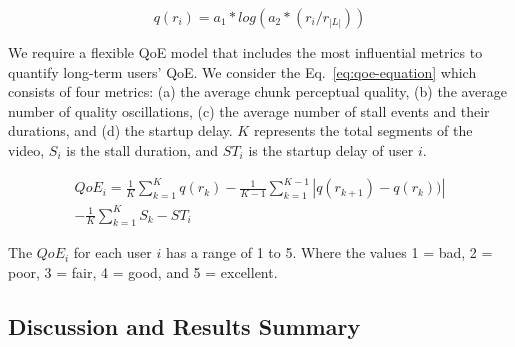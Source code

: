 $$
q(r_i) = a_1 * log(a_2 * (r_i/ r_{|L|}))
$$

We require a flexible QoE model that includes the most influential metrics to quantify long-term users' QoE. 
We consider the Eq.~\ref{eq:qoe-equation} which consists of four metrics: (a) the average chunk perceptual quality, (b) the average number of quality oscillations, (c) the average number of stall events and their durations, and (d) the startup delay. $K$ represents the total segments of the video, $S_{i}$ is the stall duration, and $ST_{i}$ is the startup delay of user $i$.

\begin{equation}\label{eq:qoe-equation}
\begin{split}
QoE_i = \frac{1}{K} \sum_{k=1}^{K}q(r_{k}) - \frac{1}{K-1} \sum_{k=1}^{K-1}|q(r_{k+1}) - q(r_{k}))| \\
- \frac{1}{K}\sum_{k=1}^{K} S_{k} - ST_{i}
\end{split}
\end{equation}

The $QoE_{i}$ for each user $i$ has a range of 1 to 5. Where the values 1 = bad, 2 = poor, 3 = fair, 4 = good, and 5 = excellent.

%

\subsection{Discussion and Results Summary}


